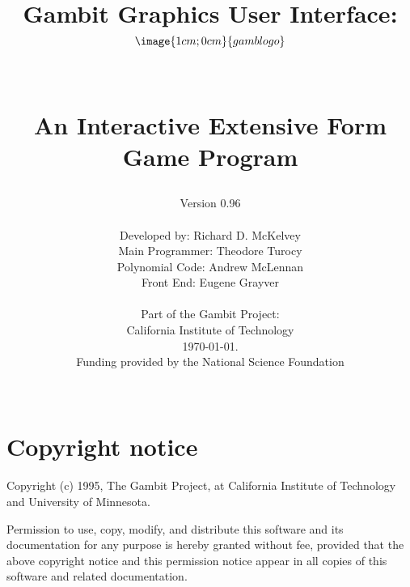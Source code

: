 %
%
%
%

\parskip=10pt%
\parindent=0pt%
\itemsep{0pt}
\title{Gambit Graphics User Interface:\\
$$\image{1cm;0cm}{gamblogo}$$\\
\centerline{An Interactive Extensive Form Game Program}}
\author{Version 0.96\\
 \\
Developed by: Richard D. McKelvey\\
Main Programmer: Theodore Turocy\\
Polynomial Code: Andrew McLennan\\
Front End: Eugene Grayver\\
 \\
Part of the Gambit Project:\\
California Institute of Technology\\ \today.\\
Funding provided by the National Science Foundation\\
 \\}

\makeindex%
%
\maketitle%


\tableofcontents%

\chapter*{Copyright notice}%

Copyright (c) 1995, The Gambit Project, at California Institute of
Technology and University of Minnesota.

Permission to use, copy, modify, and distribute this software and its
documentation for any purpose is hereby granted without fee, provided
that the above copyright notice and this permission notice appear in
all copies of this software and related documentation.

